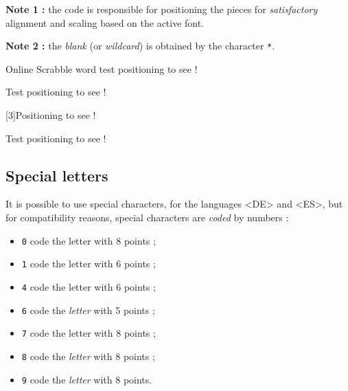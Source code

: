 \documentclass{article}
\begin{document}
\textbf{Note 1 :} the code is responsible for positioning the pieces for \textit{satisfactory} alignment and scaling based on the active font.

\smallskip

\textbf{Note 2 :} the \textit{blank} (or \textit{wildcard}) is obtained by the character \texttt{*}.

\begin{PresentationCode}{}
Online Scrabble word test positioning  to see !
\end{PresentationCode}

\begin{PresentationCode}{}
{\Huge\sffamily Test positioning  to see !}
\end{PresentationCode}

\begin{PresentationCode}{}
\scalebox{3}[3]{Positioning  to see !}
\end{PresentationCode}

\begin{PresentationCode}{}
{\LARGE Test positioning  to see !}
\end{PresentationCode}

\newpage

\subsection{Special letters}

It is possible to use special characters, for the languages \textsf{<DE>} and \textsf{<ES>}, but for compatibility reasons, special characters are \textit{coded} by numbers :

\begin{itemize}
	\item \texttt{0} code the letter  with 8 points ;
	\item \texttt{1} code the letter  with 6 points ;
	\item \texttt{4} code the letter  with 6 points ;
	\item \texttt{6} code the \textit{letter}  with 5 points ;
	\item \texttt{7} code the letter  with 8 points ;
	\item \texttt{8} code the \textit{letter}  with 8 points ;
	\item \texttt{9} code the \textit{letter}  with 8 points.
\end{itemize}
\end{document}
